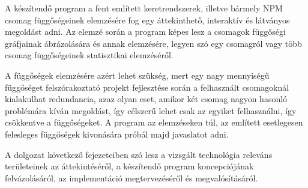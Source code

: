 A készítendő program a fent említett keretrendszerek, illetve bármely NPM csomag függőségeinek elemzésére fog egy áttekinthető, interaktív és látványos megoldást adni. Az elemzé során a program képes lesz a csomagok függőségi gráfjainak ábrázolására és annak elemzésére, legyen szó egy csomagról vagy több csomag függőségeinek statisztikai elemzéséről.

A függőségek elemzésére azért lehet szükség, mert egy nagy mennyiségű függőséget felszórakoztató projekt fejlesztése során a felhasznált csomagoknál kialakulhat redundancia, azaz olyan eset, amikor két csomag nagyon hasonló problémára kíván megoldást, így célszerű lehet csak az egyiket felhasználni, így csökkentve a függőségeket. A program az elemzéseken túl, az említett esetlegesen felesleges függőségek kivonására próbál majd javaslatot adni.

A dolgozat következő fejezeteiben szó lesz a vizsgált technológia releváns területeinek az áttekintéséről, a készítendő program koncepciójának felvázolásáról, az implementáció megtervezéséről és megvalósításáról.
